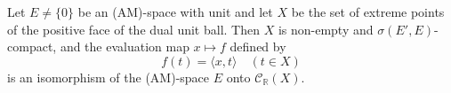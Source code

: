 Let $E \neq \{0\}$ be an (AM)-space with unit and let $X$ be the set of extreme points of the positive face of the dual unit ball. Then $X$ is non-empty and $\sigma(E', E)$-compact, and the evaluation map $x \mapsto f$ defined by
$$
f(t) = \langle x, t \rangle \quad (t \in X)
$$
is an isomorphism of the (AM)-space $E$ onto $\mathcal{C}_{\mathbb{R}}(X)$.
